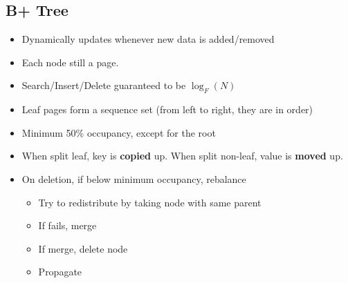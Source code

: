 \documentclass[landscape, letterpaper]{extarticle}
\begin{document}
\begin{multicols}{3}
    \subsection*{B+ Tree}
    \begin{itemize}[noitemsep,nolistsep]
        \item Dynamically updates whenever new data is added/removed
        \item Each node still a page.
        \item Search/Insert/Delete guaranteed to be \(\log_{F}(N)\)
        \item Leaf pages form a sequence set (from left to right, they are in order)
        \item Minimum 50\% occupancy, except for the root
        \item When split leaf, key is \textbf{copied} up. When split non-leaf, value is \textbf{moved} up.
        \item On deletion, if below minimum occupancy, rebalance
              \begin{itemize}
                  \item Try to redistribute by taking node with same parent
                  \item If fails, merge
                  \item If merge, delete node
                  \item Propagate
              \end{itemize}
    \end{itemize}


\end{multicols}
\end{document}

